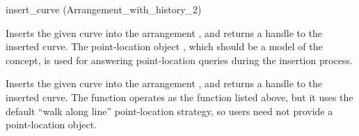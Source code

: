 
\ccRefPageBegin

\begin{ccRefFunction}{insert_curve (Arrangement_with_history_2)}



   {Inserts the given curve  into the arrangement , and returns
    a handle to the inserted curve.
    The point-location object , which should be a model of the
     concept, is used for answering
    point-location queries during the insertion process.
    }

   {Inserts the given curve  into the arrangement , and
    returns a handle to the inserted curve.
    The function operates as the function listed above, but it uses the default
    ``walk along line'' point-location strategy, so users need not provide a
    point-location object.}

\end{ccRefFunction}

\ccRefPageEnd
